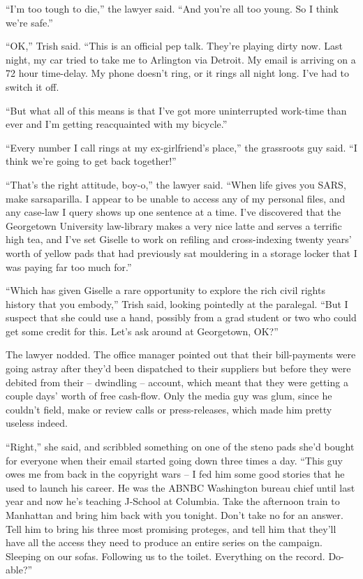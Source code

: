 “I'm too tough to die,” the lawyer said. “And you're all too 
young. So I think we're safe.”

“OK,” Trish said. “This is an official pep talk. They're playing 
dirty now. Last night, my car tried to take me to Arlington via 
Detroit. My email is arriving on a 72 hour time-delay. My phone doesn't 
ring, or it rings all night long. I've had to switch it off.

“But what all of this means is that I've got more uninterrupted 
work-time than ever and I'm getting reacquainted with my bicycle.”

“Every number I call rings at my ex-girlfriend's place,” the 
grassroots guy said. “I think we're going to get back together!”

“That's the right attitude, boy-o,” the lawyer said. “When life 
gives you SARS, make sarsaparilla. I appear to be unable to access any 
of my personal files, and any case-law I query shows up one sentence at 
a time. I've discovered that the Georgetown University law-library 
makes a very nice latte and serves a terrific high tea, and I've set 
Giselle to work on refiling and cross-indexing twenty years' worth of 
yellow pads that had previously sat mouldering in a storage locker that 
I was paying far too much for.”

“Which has given Giselle a rare opportunity to explore the rich civil 
rights history that you embody,” Trish said, looking pointedly at the 
paralegal. “But I suspect that she could use a hand, possibly from a 
grad student or two who could get some credit for this. Let's ask 
around at Georgetown, OK?”

The lawyer nodded. The office manager pointed out that their 
bill-payments were going astray after they'd been dispatched to their 
suppliers but before they were debited from their -- dwindling -- 
account, which meant that they were getting a couple days' worth of 
free cash-flow. Only the media guy was glum, since he couldn't field, 
make or review calls or press-releases, which made him pretty useless 
indeed.

“Right,” she said, and scribbled something on one of the steno pads 
she'd bought for everyone when their email started going down three 
times a day. “This guy owes me from back in the copyright wars -- I 
fed him some good stories that he used to launch his career. He was the 
ABNBC Washington bureau chief until last year and now he's teaching 
J-School at Columbia. Take the afternoon train to Manhattan and bring 
him back with you tonight. Don't take no for an answer. Tell him to 
bring his three most promising proteges, and tell him that they'll have 
all the access they need to produce an entire series on the campaign. 
Sleeping on our sofas. Following us to the toilet. Everything on the 
record. Do-able?”

